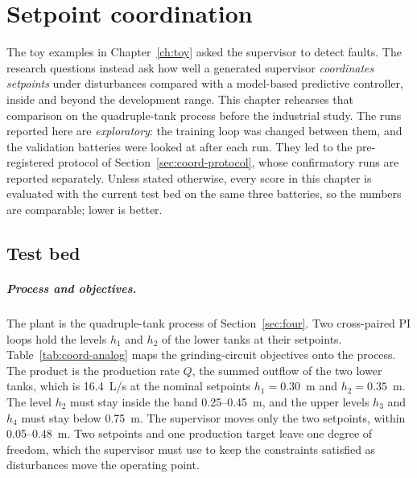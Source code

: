\chapter{Setpoint coordination}
\label{ch:coord}
The toy examples in Chapter~\ref{ch:toy} asked the supervisor to detect
faults. The research questions instead ask how well a generated supervisor
\emph{coordinates setpoints} under disturbances compared with a model-based
predictive controller, inside and beyond the development range. This chapter
rehearses that comparison on the quadruple-tank process before the industrial
study. The runs reported here are \emph{exploratory}: the training loop was
changed between them, and the validation batteries were looked at after each
run. They led to the pre-registered protocol of
Section~\ref{sec:coord-protocol}, whose confirmatory runs are reported separately.
Unless stated otherwise, every score in this chapter is evaluated with the
current test bed on the same three batteries, so the numbers are comparable;
lower is better.

\section{Test bed}
\label{sec:coord-testbed}
\paragraph{Process and objectives.} The plant is the quadruple-tank process
of Section~\ref{sec:four}. Two cross-paired PI loops hold the levels $h_1$
and $h_2$ of the lower tanks at their setpoints. Table~\ref{tab:coord-analog}
maps the grinding-circuit objectives onto the process. The product is the
production rate $Q$, the summed outflow of the two lower tanks, which is
16.4~L/s at the nominal setpoints $h_1 = 0.30$~m and $h_2 = 0.35$~m. The
level $h_2$ must stay inside the band 0.25--0.45~m, and the upper levels
$h_3$ and $h_4$ must stay below 0.75~m. The supervisor moves only the two
setpoints, within 0.05--0.48~m. Two setpoints and one production target
leave one degree of freedom, which the supervisor must use to keep the
constraints satisfied as disturbances move the operating point.

